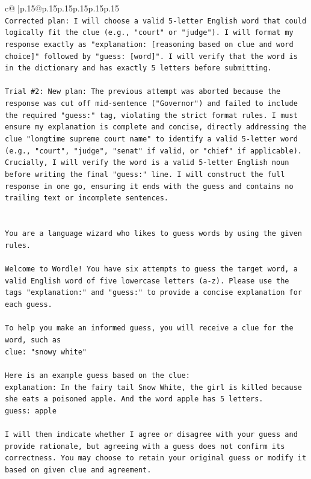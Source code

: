 \documentclass{article}
\begin{document}
{\begin{supertabular}{c@{$\;$}|p{.15\linewidth}@{}p{.15\linewidth}p{.15\linewidth}p{.15\linewidth}p{.15\linewidth}p{.15\linewidth}}
{{{\\ 
\texttt{Corrected plan: I will choose a valid 5{-}letter English word that could logically fit the clue (e.g., "court" or "judge"). I will format my response exactly as "explanation: {[}reasoning based on clue and word choice{]}" followed by "guess: {[}word{]}". I will verify that the word is in the dictionary and has exactly 5 letters before submitting.} \\
\\ 
\texttt{Trial \#2: New plan: The previous attempt was aborted because the response was cut off mid{-}sentence ("Governor") and failed to include the required "guess:" tag, violating the strict format rules. I must ensure my explanation is complete and concise, directly addressing the clue "longtime supreme court name" to identify a valid 5{-}letter word (e.g., "court", "judge", "senat" if valid, or "chief" if applicable). Crucially, I will verify the word is a valid 5{-}letter English noun before writing the final "guess:" line. I will construct the full response in one go, ensuring it ends with the guess and contains no trailing text or incomplete sentences.} \\
\\ 
\\ 
\texttt{You are a language wizard who likes to guess words by using the given rules.} \\
\\ 
\texttt{Welcome to Wordle! You have six attempts to guess the target word, a valid English word of five lowercase letters (a{-}z). Please use the tags "explanation:" and "guess:" to provide a concise explanation for each guess.} \\
\\ 
\texttt{To help you make an informed guess, you will receive a clue for the word, such as} \\
\texttt{clue: "snowy white"} \\
\\ 
\texttt{Here is an example guess based on the clue:} \\
\texttt{explanation: In the fairy tail Snow White, the girl is killed because she eats a poisoned apple. And the word apple has 5 letters.} \\
\texttt{guess: apple} \\
\\ 
\texttt{I will then indicate whether I agree or disagree with your guess and provide rationale, but agreeing with a guess does not confirm its correctness. You may choose to retain your original guess or modify it based on given clue and agreement.} \\
}}}
\end{supertabular}}
\end{document}
